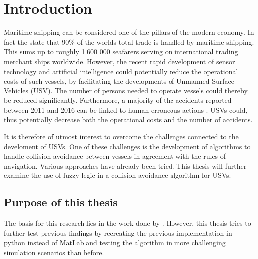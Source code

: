 

\chapter{Introduction} %

\label{Introduction} %


\newcommand{\keyword}[1]{\textbf{#1}}
\newcommand{\tabhead}[1]{\textbf{#1}}
\newcommand{\code}[1]{\texttt{#1}}
\newcommand{\file}[1]{\texttt{\bfseries#1}}
\newcommand{\option}[1]{\texttt{\itshape#1}}


Maritime shipping can be considered one of the pillars of the modern economy. In fact the \textcite{percent_trade} state that 90\% of the worlds total trade is handled by maritime shipping. This sums up to roughly 1 600 000 seafarers serving on international trading merchant ships worldwide. However, the recent rapid development of sensor technology and artificial intelligence could potentially reduce the operational costs of such vessels, by facilitating the developments of  Unmanned Surface Vehicles (USV). The number of persons needed to operate vessels could thereby be reduced significantly. Furthermore, a majority of the accidents reported between 2011 and 2016 can be linked to human erroneous actions \cite{marine_casualities_incidents_2017}. USVs could, thus potentially decrease both the operational costs and the number of accidents.

It is therefore of utmost interest to overcome the challenges connected to the develoment of USVs. One of these challenges is the development of algorithms to handle collision avoidance between vessels in agreement with the rules of navigation. Various approaches have already been tried. This thesis will further examine the use of  fuzzy logic in a collision avoidance algorithm for USVs.
\section{Purpose of this thesis}
The basis for this research lies in the work done by \textcite{perera2012intelligent}. However, this thesis tries to further test previous findings by recreating the previous implementation in python instead of MatLab and testing the algorithm in more challenging simulation scenarios than before.

